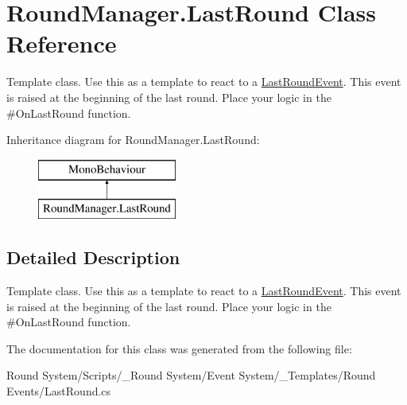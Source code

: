 \hypertarget{class_round_manager_1_1_last_round}{}\section{Round\+Manager.\+Last\+Round Class Reference}
\label{class_round_manager_1_1_last_round}


Template class. Use this as a template to react to a \hyperlink{class_round_manager_1_1_events_1_1_last_round_event}{Last\+Round\+Event}. This event is raised at the beginning of the last round. Place your logic in the \#\+On\+Last\+Round function.  


Inheritance diagram for Round\+Manager.\+Last\+Round\+:\begin{figure}[H]
\begin{center}
\leavevmode
\includegraphics[height=2.000000cm]{class_round_manager_1_1_last_round}
\end{center}
\end{figure}


\subsection{Detailed Description}
Template class. Use this as a template to react to a \hyperlink{class_round_manager_1_1_events_1_1_last_round_event}{Last\+Round\+Event}. This event is raised at the beginning of the last round. Place your logic in the \#\+On\+Last\+Round function. 



The documentation for this class was generated from the following file\+:\begin{DoxyCompactItemize}
\item 
Round System/\+Scripts/\+\_\+\+Round System/\+Event System/\+\_\+\+Templates/\+Round Events/Last\+Round.\+cs\end{DoxyCompactItemize}

